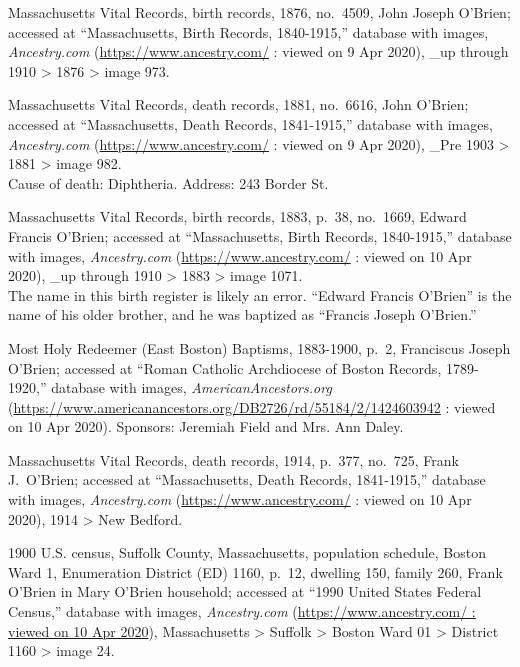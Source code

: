 \begin{thebibliography}{999}
	Massachusetts Vital Records, birth records, 1876, no.\ 4509, John Joseph O'Brien; accessed at ``Massachusetts, Birth Records, 1840-1915,'' database with images, \textit{Ancestry.com} (\url{https://www.ancestry.com/} : viewed on 9 Apr 2020), \_up through 1910 > 1876 > image 973.
	
	Massachusetts Vital Records, death records, 1881, no.\ 6616, John O'Brien; accessed at ``Massachusetts, Death Records, 1841-1915,'' database with images, \textit{Ancestry.com} (\url{https://www.ancestry.com/} : viewed on 9 Apr 2020), \_Pre 1903 > 1881 > image 982.\\
	Cause of death: Diphtheria. Address: 243 Border St.
	
	Massachusetts Vital Records, birth records, 1883, p.\ 38, no.\ 1669, Edward Francis O'Brien; accessed at ``Massachusetts, Birth Records, 1840-1915,'' database with images, \textit{Ancestry.com} (\url{https://www.ancestry.com/} : viewed on 10 Apr 2020), \_up through 1910 > 1883 > image 1071.\\
	The name in this birth register is likely an error. ``Edward Francis O'Brien'' is the name of his older brother, and he was baptized as ``Francis Joseph O'Brien.''
	
	Most Holy Redeemer (East Boston) Baptisms, 1883-1900, p.\ 2, Franciscus Joseph O'Brien; accessed at ``Roman Catholic Archdiocese of Boston Records, 1789-1920,'' database with images, \textit{AmericanAncestors.org} (\url{https://www.americanancestors.org/DB2726/rd/55184/2/1424603942} : viewed on 10 Apr 2020).	
	Sponsors: Jeremiah Field and Mrs. Ann Daley.
	
	Massachusetts Vital Records, death records, 1914, p.\ 377, no.\ 725, Frank J.\ O'Brien; accessed at ``Massachusetts, Death Records, 1841-1915,'' database with images, \textit{Ancestry.com} (\url{https://www.ancestry.com/} : viewed on 10 Apr 2020), 1914 > New Bedford.
	
	1900 U.S. census, Suffolk County, Massachusetts, population schedule, Boston Ward 1, Enumeration District (ED) 1160, p.\ 12, dwelling 150, family 260, Frank O'Brien in Mary O'Brien household; accessed at ``1990 United States Federal Census,'' database with images, \textit{Ancestry.com} (\url{https://www.ancestry.com/ : viewed on 10 Apr 2020}), Massachusetts > Suffolk > Boston Ward 01 > District 1160 > image 24.
	

\end{thebibliography}
